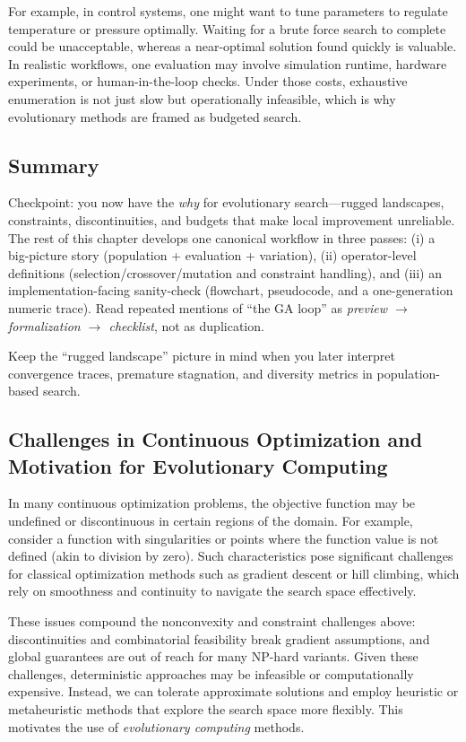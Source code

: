 For example, in control systems, one might want to tune parameters to regulate temperature or pressure optimally. Waiting for a brute force search to complete could be unacceptable, whereas a near-optimal solution found quickly is valuable.
In realistic workflows, one evaluation may involve simulation runtime, hardware experiments, or human-in-the-loop checks. Under those costs, exhaustive enumeration is not just slow but operationally infeasible, which is why evolutionary methods are framed as budgeted search.

\subsection{Summary}
\label{sec:evo_summary}

Checkpoint: you now have the \emph{why} for evolutionary search---rugged landscapes, constraints, discontinuities, and budgets that make local improvement unreliable. The rest of this chapter develops one canonical workflow in three passes:
(i) a big-picture story (population + evaluation + variation),
(ii) operator-level definitions (selection/crossover/mutation and constraint handling),
and (iii) an implementation-facing sanity-check (flowchart, pseudocode, and a one-generation numeric trace).
Read repeated mentions of ``the GA loop'' as \emph{preview \(\rightarrow\) formalization \(\rightarrow\) checklist}, not as duplication.

Keep the ``rugged landscape'' picture in mind when you later interpret convergence traces, premature stagnation, and diversity metrics in population-based search.

\subsection{Challenges in Continuous Optimization and Motivation for Evolutionary Computing}
\label{sec:evo_challenges_in_continuous_optimization_and_motivation_for_evolutionary_computing}

In many continuous optimization problems, the objective function may be undefined or discontinuous in certain regions of the domain. For example, consider a function with singularities or points where the function value is not defined (akin to division by zero). Such characteristics pose significant challenges for classical optimization methods such as gradient descent or hill climbing, which rely on smoothness and continuity to navigate the search space effectively.

These issues compound the nonconvexity and constraint challenges above: discontinuities and combinatorial feasibility break gradient assumptions, and global guarantees are out of reach for many NP-hard variants. Given these challenges, deterministic approaches may be infeasible or computationally expensive. Instead, we can tolerate approximate solutions and employ heuristic or metaheuristic methods that explore the search space more flexibly. This motivates the use of \emph{evolutionary computing} methods.

